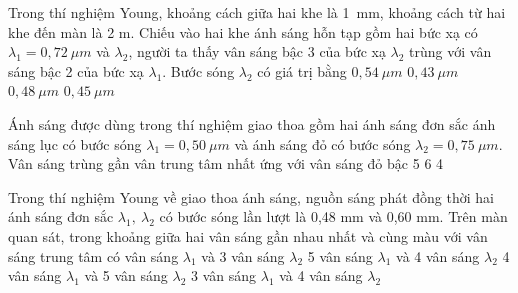 \begin{vidu}%
Trong thí nghiệm Young, khoảng cách giữa hai khe là 1\ mm, khoảng cách từ hai khe đến màn là 2 m. Chiếu vào hai khe ánh sáng hỗn tạp gồm hai bức xạ có $\lambda_1=0,72\ \mu m$ và $\lambda_2$, người ta thấy vân sáng bậc 3 của bức xạ $\lambda_2$ trùng với vân sáng bậc 2 của bức xạ $\lambda_1$. Bước sóng  $\lambda_2$ có giá trị bằng
\choice
{$0,54\ \mu m$}
{$0,43\ \mu m$}
{\True $0,48\ \mu m$}
{$0,45\ \mu m$}
\end{vidu} 
\begin{vidu}%
Ánh sáng được dùng trong thí nghiệm giao thoa gồm hai ánh sáng đơn sắc ánh sáng lục có bước sóng $\lambda_1=0,50\ \mu m $ và ánh sáng đỏ có bước sóng $\lambda_2=0,75\ \mu m $. Vân sáng trùng gần vân trung tâm nhất ứng với vân sáng đỏ bậc
\choice
{5}
{6}
{4}
{}
\end{vidu} 
\begin{vidu}%
Trong thí nghiệm Young về giao thoa ánh sáng, nguồn sáng phát đồng thời hai ánh sáng đơn sắc $\lambda_1,\ \lambda_2 $ có bước sóng lần lượt là 0,48 mm và 0,60 mm. Trên màn quan sát, trong khoảng giữa hai vân sáng gần nhau nhất và cùng màu với vân sáng trung tâm có
\choice
{ vân sáng $\lambda_1 $ và 3 vân sáng $\lambda_2 $}
{5 vân sáng $\lambda_1 $ và 4 vân sáng $\lambda_2 $}
{4 vân sáng $\lambda_1 $ và 5 vân sáng $\lambda_2 $}
{3 vân sáng $\lambda_1 $ và 4 vân sáng $\lambda_2 $}
\end{vidu} 
